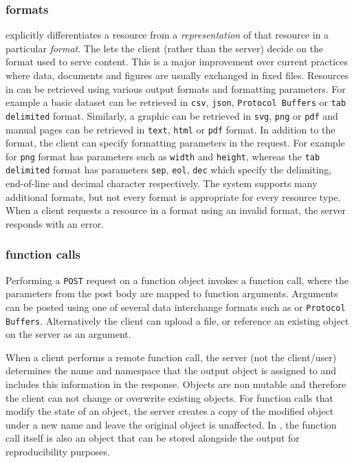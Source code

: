 \subsubsection{formats}

\OpenCPU explicitly differentiates a resource from a \emph{representation} of that resource in a particular \emph{format}. The \API lets the client (rather than the server) decide on the format used to serve content. This is a major improvement over current practices where data, documents and figures are usually exchanged in fixed files. Resources in \OpenCPU can be retrieved using various output formats and formatting parameters. For example a basic dataset can be retrieved in \texttt{csv}, \texttt{json}, \texttt{Protocol Buffers} or \texttt{tab delimited} format. Similarly, a graphic can be retrieved in \texttt{svg}, \texttt{png} or \texttt{pdf} and manual pages can be retrieved in \texttt{text}, \texttt{html} or \texttt{pdf} format. In addition to the format, the client can specify formatting parameters in the request. For example for \texttt{png} format has parameters such as \texttt{width} and \texttt{height}, whereas the \texttt{tab delimited} format has parameters \texttt{sep}, \texttt{eol}, \texttt{dec} which specify the delimiting, end-of-line and decimal character respectively. The system supports many additional formats, but not every format is appropriate for every resource type. When a client requests a resource in a format using an invalid format, the server responds with an error. 

\subsubsection{function calls}

Performing a \texttt{POST} request on a function object invokes a function call, where the \HTTP parameters from the post body are mapped to function arguments. Arguments can be posted using one of several data interchange formats such as \JSON or \texttt{Protocol Buffers}. Alternatively the client can upload a file, or reference an existing object on the server as an argument.

When a client performs a remote function call, the server (not the client/user) determines the name and namespace that the output object is assigned to and includes this information in the response. Objects are non mutable and therefore the client can not change or overwrite existing objects. For function calls that modify the state of an object, the server creates a copy of the modified object under a new name and leave the original object is unaffected. In \R, the function call itself is also an object that can be stored alongside the output for reproducibility purposes. 

